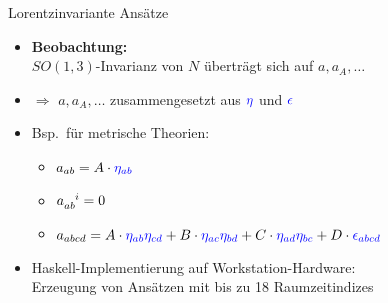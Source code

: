 \documentclass{beamer}
\begin{document}
    \begin{frame}{Lorentzinvariante Ansätze}
        \begin{itemize}
            \item \textbf{Beobachtung:} \\ $SO(1,3)$-Invarianz von $N$ überträgt sich auf $a, a_A, \ldots$
            \item $\Rightarrow$ $a, a_A, \ldots$ zusammengesetzt aus ${\color{blue}\eta}$ und ${\color{blue}\epsilon}$
            \item Bsp.\ für metrische Theorien:
            \begin{itemize}
                \item $a_{ab} = A \cdot {\color{blue}\eta_{ab}}$
                \item $a_{ab}^{\hphantom{ab}i} = 0$
                \item $a_{abcd} = A\cdot {\color{blue}\eta_{ab} \eta_{cd}} + B\cdot {\color{blue}\eta_{ac} \eta_{bd}} + C\cdot {\color{blue}\eta_{ad} \eta_{bc}} + D \cdot {\color{blue}\epsilon_{abcd}}$
            \end{itemize}
            \item Haskell-Implementierung auf Workstation-Hardware: \\
            Erzeugung von Ansätzen mit bis zu 18 Raumzeitindizes
        \end{itemize}
    \end{frame}
\end{document}
